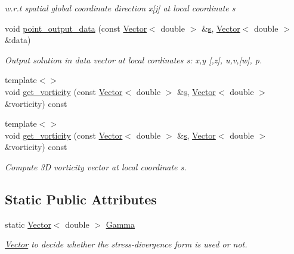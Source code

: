 \begin{DoxyCompactItemize}
\begin{DoxyCompactList}\small\item\em w.\+r.\+t spatial global coordinate direction x\mbox{[}j\mbox{]} at local coordinate s \end{DoxyCompactList}\item 
void \hyperlink{classoomph_1_1NavierStokesEquations_afd6f8376bf83a87164cd3c490270798e}{point\+\_\+output\+\_\+data} (const \hyperlink{classoomph_1_1Vector}{Vector}$<$ double $>$ \&\hyperlink{cfortran_8h_ab7123126e4885ef647dd9c6e3807a21c}{s}, \hyperlink{classoomph_1_1Vector}{Vector}$<$ double $>$ \&data)
\begin{DoxyCompactList}\small\item\em Output solution in data vector at local cordinates s\+: x,y \mbox{[},z\mbox{]}, u,v,\mbox{[}w\mbox{]}, p. \end{DoxyCompactList}\item 
{\footnotesize template$<$$>$ }\\void \hyperlink{classoomph_1_1NavierStokesEquations_a11d44f54aae0eccda7e34e51a270de4a}{get\+\_\+vorticity} (const \hyperlink{classoomph_1_1Vector}{Vector}$<$ double $>$ \&\hyperlink{cfortran_8h_ab7123126e4885ef647dd9c6e3807a21c}{s}, \hyperlink{classoomph_1_1Vector}{Vector}$<$ double $>$ \&vorticity) const
\item 
{\footnotesize template$<$$>$ }\\void \hyperlink{classoomph_1_1NavierStokesEquations_adba47f99c44237f2687ae609496eaf60}{get\+\_\+vorticity} (const \hyperlink{classoomph_1_1Vector}{Vector}$<$ double $>$ \&\hyperlink{cfortran_8h_ab7123126e4885ef647dd9c6e3807a21c}{s}, \hyperlink{classoomph_1_1Vector}{Vector}$<$ double $>$ \&vorticity) const
\begin{DoxyCompactList}\small\item\em Compute 3D vorticity vector at local coordinate s. \end{DoxyCompactList}\end{DoxyCompactItemize}
\subsection*{Static Public Attributes}
\begin{DoxyCompactItemize}
\item 
static \hyperlink{classoomph_1_1Vector}{Vector}$<$ double $>$ \hyperlink{classoomph_1_1NavierStokesEquations_aff5d91438414b0c5f6ab117a84d6749a}{Gamma}
\begin{DoxyCompactList}\small\item\em \hyperlink{classoomph_1_1Vector}{Vector} to decide whether the stress-\/divergence form is used or not. \end{DoxyCompactList}\end{DoxyCompactItemize}
